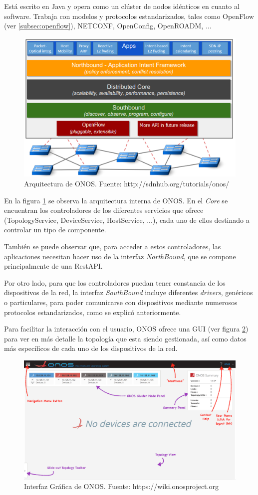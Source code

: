 Está escrito en Java y opera como un clúster de nodos idénticos en cuanto al software. Trabaja con modelos y protocolos estandarizados, tales como OpenFlow (ver \ref{subsec:openflow}), NETCONF, OpenConfig, OpenROADM, ...


\begin{figure}[!ht]
	\centering
	\includegraphics[width=0.6\linewidth]{imagenes/onos_architecture}
	\caption{Arquitectura de ONOS. 
		Fuente: http://sdnhub.org/tutorials/onos/}
	\label{fig:onosarch}
\end{figure}

En la figura \ref{fig:onosarch} se observa la arquitectura interna de ONOS. En el \textit{Core} se encuentran los controladores de los diferentes servicios que ofrece (TopologyService, DeviceService, HostService, ...), cada uno de ellos destinado a controlar un tipo de componente.

También se puede observar que, para acceder a estos controladores, las aplicaciones necesitan hacer uso de la interfaz \textit{NorthBound}, que se compone principalmente de una RestAPI.

Por otro lado, para que los controladores puedan tener constancia de los dispositivos de la red, la interfaz \textit{SouthBound} incluye diferentes \textit{drivers}, genéricos o particulares, para poder comunicarse con dispositivos mediante numerosos protocolos estandarizados, como se explicó anteriormente.

\clearpage

Para facilitar la interacción con el usuario, ONOS ofrece una GUI (ver figura \ref{fig:onosgui}) para ver en más detalle la topología que esta siendo gestionada, así como datos más específicos de cada uno de los dispositivos de la red. 

\begin{figure}[!ht]
	\centering
	\includegraphics[width=0.8\linewidth]{imagenes/onos_gui}
	\caption{Interfaz Gráfica de ONOS. 
		Fuente: https://wiki.onosproject.org}
	\label{fig:onosgui}
\end{figure}

